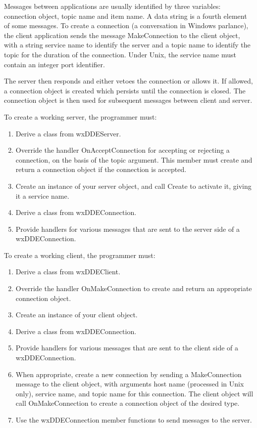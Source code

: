 Messages between applications are usually identified by three variables:
connection object, topic name and item name.  A data string is a fourth
element of some messages. To create a connection (a conversation in
Windows parlance), the client application sends the message
MakeConnection to the client object, with a string service name to
identify the server and a topic name to identify the topic for the
duration of the connection. Under Unix, the service name must contain an
integer port identifier.

The server then responds and either vetoes the connection or allows it.
If allowed, a connection object is created which persists until the
connection is closed.  The connection object is then used for subsequent
messages between client and server.

To create a working server, the programmer must:

\begin{enumerate}\itemsep=0pt
\item Derive a class from wxDDEServer.
\item Override the handler OnAcceptConnection for accepting or rejecting a connection,
on the basis of the topic argument. This member must create and return a connection
object if the connection is accepted.
\item Create an instance of your server object, and call Create to
activate it, giving it a service name.
\item Derive a class from wxDDEConnection.
\item Provide handlers for various messages that are sent to the server
side of a wxDDEConnection.
\end{enumerate}

To create a working client, the programmer must:

\begin{enumerate}\itemsep=0pt
\item Derive a class from wxDDEClient.
\item Override the handler OnMakeConnection to create and return
an appropriate connection object.
\item Create an instance of your client object.
\item Derive a class from wxDDEConnection.
\item Provide handlers for various messages that are sent to the client
side of a wxDDEConnection.
\item When appropriate, create a new connection by sending a MakeConnection
message to the client object, with arguments host name (processed in Unix only),
service name, and topic name for this connection. The client object will call OnMakeConnection
to create a connection object of the desired type.
\item Use the wxDDEConnection member functions to send messages to the server.
\end{enumerate}

